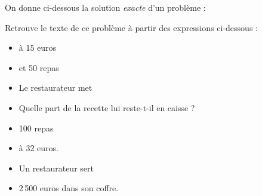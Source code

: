 On donne ci-dessous la solution {\em exacte} d'un problème :
\begin{center}
\end{center}
Retrouve le texte de ce problème à partir des expressions ci-dessous :
\begin{itemize}
\item à 15 euros
\item et 50 repas
\item Le restaurateur met
\item Quelle part de la recette lui reste-t-il en caisse ?
\item 100 repas
\item à 32 euros.
\item Un restaurateur sert
\item 2\,500 euros dans son coffre.
\end{itemize}
